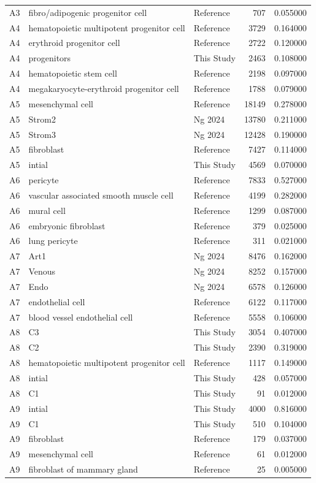 \begin{longtable}{lllrr}
A3 & fibro/adipogenic progenitor cell & Reference & 707 & 0.055000 \\
A4 & hematopoietic multipotent progenitor cell & Reference & 3729 & 0.164000 \\
A4 & erythroid progenitor cell & Reference & 2722 & 0.120000 \\
A4 & progenitors & This Study & 2463 & 0.108000 \\
A4 & hematopoietic stem cell & Reference & 2198 & 0.097000 \\
A4 & megakaryocyte-erythroid progenitor cell & Reference & 1788 & 0.079000 \\
A5 & mesenchymal cell & Reference & 18149 & 0.278000 \\
A5 & Strom2 & Ng 2024 & 13780 & 0.211000 \\
A5 & Strom3 & Ng 2024 & 12428 & 0.190000 \\
A5 & fibroblast & Reference & 7427 & 0.114000 \\
A5 & intial & This Study & 4569 & 0.070000 \\
A6 & pericyte & Reference & 7833 & 0.527000 \\
A6 & vascular associated smooth muscle cell & Reference & 4199 & 0.282000 \\
A6 & mural cell & Reference & 1299 & 0.087000 \\
A6 & embryonic fibroblast & Reference & 379 & 0.025000 \\
A6 & lung pericyte & Reference & 311 & 0.021000 \\
A7 & Art1 & Ng 2024 & 8476 & 0.162000 \\
A7 & Venous & Ng 2024 & 8252 & 0.157000 \\
A7 & Endo & Ng 2024 & 6578 & 0.126000 \\
A7 & endothelial cell & Reference & 6122 & 0.117000 \\
A7 & blood vessel endothelial cell & Reference & 5558 & 0.106000 \\
A8 & C3 & This Study & 3054 & 0.407000 \\
A8 & C2 & This Study & 2390 & 0.319000 \\
A8 & hematopoietic multipotent progenitor cell & Reference & 1117 & 0.149000 \\
A8 & intial & This Study & 428 & 0.057000 \\
A8 & C1 & This Study & 91 & 0.012000 \\
A9 & intial & This Study & 4000 & 0.816000 \\
A9 & C1 & This Study & 510 & 0.104000 \\
A9 & fibroblast & Reference & 179 & 0.037000 \\
A9 & mesenchymal cell & Reference & 61 & 0.012000 \\
A9 & fibroblast of mammary gland & Reference & 25 & 0.005000 \\
\end{longtable}
